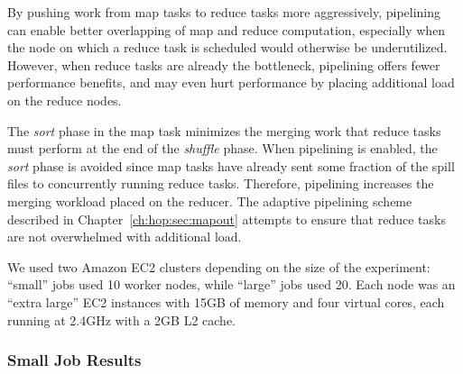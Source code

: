 By pushing work from map tasks to reduce tasks more aggressively, pipelining
can enable better overlapping of map and reduce computation, especially when
the node on which a reduce task is scheduled would otherwise be underutilized.
However, when reduce tasks are already the bottleneck, pipelining offers fewer
performance benefits, and may even hurt performance by placing additional load
on the reduce nodes.

The {\em sort} phase in the map task minimizes the merging work that reduce
tasks must perform at the end of the {\em shuffle} phase.  When pipelining is
enabled, the {\em sort} phase is avoided since map tasks have already sent some
fraction of the spill files to concurrently running reduce tasks.  Therefore,
pipelining increases the merging workload placed on the reducer.  The adaptive
pipelining scheme described in Chapter~\ref{ch:hop:sec:mapout} attempts to
ensure that reduce tasks are not overwhelmed with additional load.

We used two Amazon EC2 clusters depending on the size of the experiment:
``small'' jobs used 10 worker nodes, while ``large'' jobs used 20.  Each node
was an ``extra large'' EC2 instances with 15GB of memory and four virtual
cores, each running at 2.4GHz with a 2GB L2 cache.

\subsubsection{Small Job Results}

